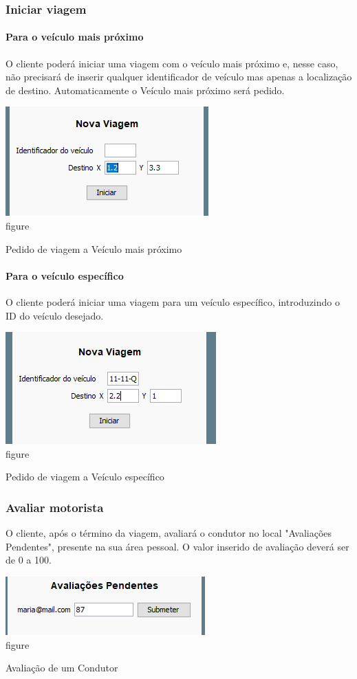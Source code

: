 \documentclass[a4paper]{article}
\begin{document}
\subsubsection{Iniciar viagem}
\paragraph{Para o veículo mais próximo}
O cliente poderá iniciar uma viagem com o veículo mais próximo e, nesse caso, não precisará de inserir qualquer identificador de veículo mas apenas a localização de destino. Automaticamente o Veículo mais próximo será pedido.
\begin{center}
  \includegraphics[scale=0.75]{cliente_viagemprox}\\
  \caption{figure}{Pedido de viagem a Veículo mais próximo}
  \label{fig:picture}
\end{center}
\paragraph{Para o veículo específico}
O cliente poderá iniciar uma viagem para um veículo específico, introduzindo o ID do veículo desejado.
\begin{center}
  \includegraphics[scale=0.75]{cliente_viagemid}\\
  \caption{figure}{Pedido de viagem a Veículo específico}
  \label{fig:picture}
\end{center}
\subsubsection{Avaliar motorista}
O cliente, após o término da viagem, avaliará o condutor no local "Avaliações Pendentes", presente na sua área pessoal. O valor inserido de avaliação deverá ser de 0 a 100.
\begin{center}
  \includegraphics[scale=0.75]{cliente_avaliacao}\\
  \caption{figure}{Avaliação de um Condutor}
  \label{fig:picture}
\end{center}
\end{document}
